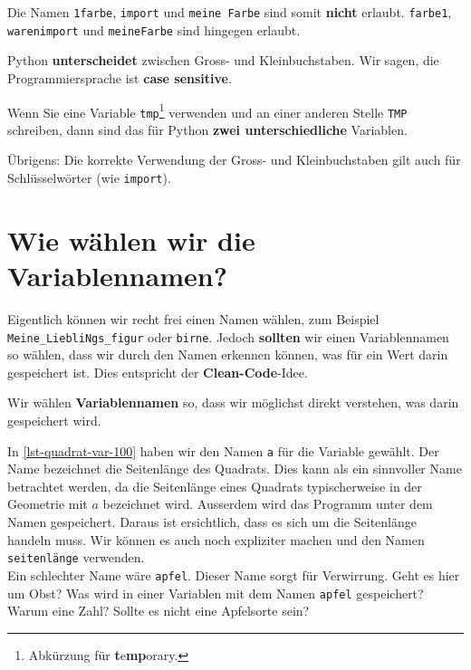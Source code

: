 Die Namen \lstinline{1farbe}, \lstinline{import} und \lstinline{meine Farbe} sind somit \textbf{nicht} erlaubt. \lstinline{farbe1}, \lstinline{warenimport} und \lstinline{meineFarbe} sind hingegen erlaubt.

\begin{important}
Python \textbf{unterscheidet} zwischen Gross- und Kleinbuchstaben. Wir sagen, die Programmiersprache ist \textbf{case sensitive}.
\end{important}

\begin{example}
	Wenn Sie eine Variable \lstinline{tmp}\footnote{Abkürzung für \textbf{t}e\textbf{mp}orary.} verwenden und an einer anderen Stelle \lstinline{TMP} schreiben, dann sind das für Python \textbf{zwei unterschiedliche} Variablen. 
\end{example}

Übrigens: Die korrekte Verwendung der Gross- und Kleinbuchstaben gilt auch für Schlüsselwörter (wie \lstinline{import}).

\section{Wie wählen wir die Variablennamen?}

Eigentlich können wir recht frei einen Namen wählen, zum Beispiel \lstinline{Meine_LiebliNgs_figur} oder \lstinline{birne}. Jedoch \textbf{sollten} wir einen Variablennamen so wählen, dass wir durch den Namen erkennen können, was für ein Wert darin gespeichert ist. Dies entspricht der \textbf{Clean-Code}-Idee.

\begin{cleancode}
Wir wählen \textbf{Variablennamen} so, dass wir möglichst direkt verstehen, was darin gespeichert wird.
\end{cleancode}

\begin{example}
In \autoref{lst-quadrat-var-100} haben wir den Namen \lstinline{a} für die Variable gewählt. Der Name bezeichnet die Seitenlänge des Quadrats. Dies kann als ein sinnvoller Name betrachtet werden, da die Seitenlänge eines Quadrats typischerweise in der Geometrie mit $a$ bezeichnet wird. Ausserdem wird das Programm unter dem Namen  gespeichert. Daraus ist ersichtlich, dass es sich um die Seitenlänge handeln muss. Wir können es auch noch expliziter machen und den Namen \lstinline{seitenlänge} verwenden.\\
Ein schlechter Name wäre \lstinline{apfel}. Dieser Name sorgt für Verwirrung. Geht es hier um Obst? Was wird in einer Variablen mit dem Namen \lstinline{apfel} gespeichert? Warum eine Zahl? Sollte es nicht eine Apfelsorte sein?
\end{example}

